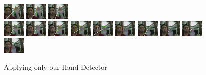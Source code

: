 \documentclass[12pt]{article}
\begin{document}
\begin{figure}[H]
\includegraphics[width=40px, height=30px]{../data/simple/img0037.jpg}
\includegraphics[width=40px, height=30px]{../data/simple/img0038.jpg}
\includegraphics[width=40px, height=30px]{../data/simple/img0039.jpg} \\
\includegraphics[width=40px, height=30px]{../data/simple/img0040.jpg}
\includegraphics[width=40px, height=30px]{../data/simple/img0041.jpg}
\includegraphics[width=40px, height=30px]{../data/simple/img0042.jpg}
\includegraphics[width=40px, height=30px]{../data/simple/img0043.jpg}
\includegraphics[width=40px, height=30px]{../data/simple/img0044.jpg}
\includegraphics[width=40px, height=30px]{../data/simple/img0045.jpg}
\includegraphics[width=40px, height=30px]{../data/simple/img0046.jpg}
\includegraphics[width=40px, height=30px]{../data/simple/img0047.jpg}
\includegraphics[width=40px, height=30px]{../data/simple/img0048.jpg}
\includegraphics[width=40px, height=30px]{../data/simple/img0049.jpg}
\label{seq-simple}
\caption{Applying only our Hand Detector}
\end{figure}
\end{document}
